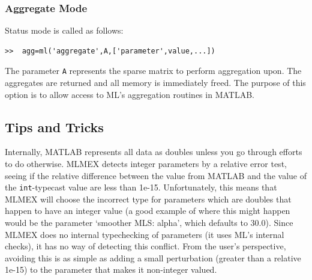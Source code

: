 \documentclass{article}[11pt]
\begin{document}
\subsubsection{Aggregate Mode}
Status mode is called as follows:
\begin{verbatim}
>>  agg=ml('aggregate',A,['parameter',value,...])
\end{verbatim}
The parameter \texttt{A} represents the sparse matrix to perform
aggregation upon.  The aggregates are returned and all memory is
immediately freed.  The purpose of this option is to allow access to
ML's aggregation routines in MATLAB.

\subsection{Tips and Tricks }\label{sec:mlmex:tips}

Internally, MATLAB represents all data as doubles unless you go
through efforts to do otherwise.  MLMEX detects integer parameters by
a relative error test, seeing if the relative difference between the
value from MATLAB and the value of the \texttt{int}-typecast value are
less than 1e-15.  Unfortunately, this means that MLMEX will choose the 
incorrect type for parameters which are doubles that happen to have an
integer value (a good example of where this might happen would be the parameter
`smoother MLS: alpha', which defaults to 30.0).  Since MLMEX does no
internal typechecking of 
parameters (it uses ML's internal checks), it has no way of detecting
this conflict.  From the user's perspective, avoiding this is as
simple as adding a small perturbation (greater than a relative 1e-15)
to the parameter that makes it non-integer valued.






\end{document}
